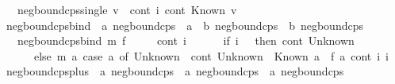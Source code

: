 \begin{isabellebody}
\ \ \ {\isachardoublequoteopen}neg{\isacharunderscore}{\kern0pt}bound{\isacharunderscore}{\kern0pt}cps{\isacharunderscore}{\kern0pt}single\ v\ {\isacharequal}{\kern0pt}\ {\isacharparenleft}{\kern0pt}{\isasymlambda}cont\ i{\isachardot}{\kern0pt}\ cont\ {\isacharparenleft}{\kern0pt}Known\ v{\isacharparenright}{\kern0pt}{\isacharparenright}{\kern0pt}{\isachardoublequoteclose}\isanewline
\isanewline
{}\isamarkupfalse%
\ neg{\isacharunderscore}{\kern0pt}bound{\isacharunderscore}{\kern0pt}cps{\isacharunderscore}{\kern0pt}bind\ {\isacharcolon}{\kern0pt}{\isacharcolon}{\kern0pt}\ {\isachardoublequoteopen}{\isacharprime}{\kern0pt}a\ neg{\isacharunderscore}{\kern0pt}bound{\isacharunderscore}{\kern0pt}cps\ {\isasymRightarrow}\ {\isacharparenleft}{\kern0pt}{\isacharprime}{\kern0pt}a\ {\isasymRightarrow}\ {\isacharprime}{\kern0pt}b\ neg{\isacharunderscore}{\kern0pt}bound{\isacharunderscore}{\kern0pt}cps{\isacharparenright}{\kern0pt}\ {\isasymRightarrow}\ {\isacharprime}{\kern0pt}b\ neg{\isacharunderscore}{\kern0pt}bound{\isacharunderscore}{\kern0pt}cps{\isachardoublequoteclose}\isanewline
\ \ \ {\isachardoublequoteopen}neg{\isacharunderscore}{\kern0pt}bound{\isacharunderscore}{\kern0pt}cps{\isacharunderscore}{\kern0pt}bind\ m\ f\ {\isacharequal}{\kern0pt}\isanewline
\ \ \ \ {\isacharparenleft}{\kern0pt}{\isasymlambda}cont\ i{\isachardot}{\kern0pt}\isanewline
\ \ \ \ \ \ if\ i\ {\isacharequal}{\kern0pt}\ {}\ then\ cont\ Unknown\isanewline
\ \ \ \ \ \ else\ m\ {\isacharparenleft}{\kern0pt}{\isasymlambda}a{\isachardot}{\kern0pt}\ case\ a\ of\ Unknown\ {\isasymRightarrow}\ cont\ Unknown\ {\isacharbar}{\kern0pt}\ Known\ a{\isacharprime}{\kern0pt}\ {\isasymRightarrow}\ f\ a{\isacharprime}{\kern0pt}\ cont\ i{\isacharparenright}{\kern0pt}\ {\isacharparenleft}{\kern0pt}i\ {\isacharminus}{\kern0pt}\ {}{\isacharparenright}{\kern0pt}{\isacharparenright}{\kern0pt}{\isachardoublequoteclose}\isanewline
\isanewline
{}\isamarkupfalse%
\ neg{\isacharunderscore}{\kern0pt}bound{\isacharunderscore}{\kern0pt}cps{\isacharunderscore}{\kern0pt}plus\ {\isacharcolon}{\kern0pt}{\isacharcolon}{\kern0pt}\ {\isachardoublequoteopen}{\isacharprime}{\kern0pt}a\ neg{\isacharunderscore}{\kern0pt}bound{\isacharunderscore}{\kern0pt}cps\ {\isasymRightarrow}\ {\isacharprime}{\kern0pt}a\ neg{\isacharunderscore}{\kern0pt}bound{\isacharunderscore}{\kern0pt}cps\ {\isasymRightarrow}\ {\isacharprime}{\kern0pt}a\ neg{\isacharunderscore}{\kern0pt}bound{\isacharunderscore}{\kern0pt}cps{\isachardoublequoteclose}\isanewline

\end{isabellebody}
